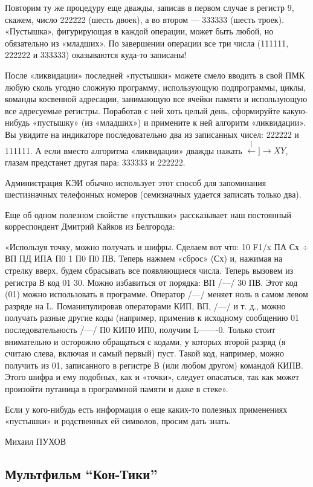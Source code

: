 \documentclass[11pt,a4paper,oneside]{article}
\def\XY{$\stackrel[\leftarrow]{\rightarrow}{XY}$}
\begin{document}
Повторим ту же процедуру еще дважды, записав в первом случае в регистр 9, скажем, число 222222 (шесть двоек), а во втором — 333333 (шесть троек). «Пустышка», фигурирующая в каждой операции, может быть любой, но обязательно из «младших». По завершении операции все три числа (111111, 222222 и 333333) оказываются куда-то записаны!

После «ликвидации» последней «пустышки» можете смело вводить в свой ПМК любую сколь угодно сложную программу, использующую подпрограммы, циклы, команды косвенной адресации, занимающую все ячейки памяти и использующую все адресуемые регистры. Поработав с ней хоть целый день, сформируйте какую-нибудь «пустышку» (из «младших») и примените к ней алгоритм «ликвидации». Вы увидите на индикаторе последовательно два из записанных чисел: 222222 и 111111. А если вместо алгоритма «ликвидации» дважды нажать \XY, глазам предстанет другая пара: 333333 и 222222.

Администрация КЭИ обычно использует этот способ для запоминания шестизначных телефонных номеров (семизначных удается записать только два).

Еще об одном полезном свойстве «пустышки» рассказывает наш постоянный корреспондент Дмитрий Кайков из Белгорода:

«Используя точку, можно получать и шифры. Сделаем вот что: 10 F1/x ПА Сх $\div$ ВП ПД ИПА П0 1 П0 П0 ПВ. Теперь нажмем «сброс» (Сх) и, нажимая на стрелку вверх, будем сбрасывать все появляющиеся числа. Теперь вызовем из регистра В код 01 30. Можно избавиться от порядка: ВП /—/ 30 ПВ. Этот код (01) можно использовать в программе. Оператор /—/ меняет ноль в самом левом разряде на L. Поманипулировав операторами КИП, ВП, /—/ и т. д., можно получать разные другие коды (например, применив к исходному сообщению 01 последовательность /—/ П0 КИП0 ИП0, получим L-------0. Только стоит внимательно и осторожно обращаться с кодами, у которых второй разряд (я считаю слева, включая и самый первый) пуст. Такой код, например, можно получить из 01, записанного в регистре В (или любом другом) командой КИПВ. Этого шифра и ему подобных, как и «точки», следует опасаться, так как может произойти путаница в программной памяти и даже в стеке».

Если у кого-нибудь есть информация о еще каких-то полезных применениях «пустышки» и родственных ей символов, просим дать знать.

Михаил ПУХОВ

\subsection{Мультфильм ``Кон-Тики''}
\end{document}
